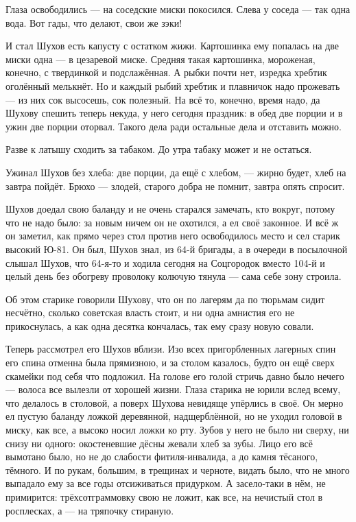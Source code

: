 Глаза освободились --- на соседские миски покосился. Слева у соседа --- так одна вода. Вот гады, что делают, свои же зэки!

И стал Шухов есть капусту с остатком жижи. Картошинка ему попалась на две миски одна --- в цезаревой миске. Средняя такая картошинка, мороженая, конечно, с твердинкой и подслажённая. А рыбки почти нет, изредка хребтик оголённый мелькнёт. Но и каждый рыбий хребтик и плавничок надо прожевать --- из них сок высосешь, сок полезный. На всё то, конечно, время надо, да Шухову спешить теперь некуда, у него сегодня праздник: в обед две порции и в ужин две порции оторвал. Такого дела ради остальные дела и отставить можно.

Разве к латышу сходить за табаком. До утра табаку может и не остаться.

Ужинал Шухов без хлеба: две порции, да ещё с хлебом, --- жирно будет, хлеб на завтра пойдёт. Брюхо --- злодей, старого добра не помнит, завтра опять спросит.

Шухов доедал свою баланду и не очень старался замечать, кто вокруг, потому что не надо было: за новым ничем он не охотился, а ел своё законное. И всё ж он заметил, как прямо через стол против него освободилось место и сел старик высокий Ю-81. Он был, Шухов знал, из 64-й бригады, а в очереди в посылочной слышал Шухов, что 64-я-то и ходила сегодня на Соцгородок вместо 104-й и целый день без обогреву проволоку колючую тянула --- сама себе зону строила.

Об этом старике говорили Шухову, что он по лагерям да по тюрьмам сидит несчётно, сколько советская власть стоит, и ни одна амнистия его не прикоснулась, а как одна десятка кончалась, так ему сразу новую совали.

Теперь рассмотрел его Шухов вблизи. Изо всех пригорбленных лагерных спин его спина отменна была прямизною, и за столом казалось, будто он ещё сверх скамейки под себя что подложил. На голове его голой стричь давно было нечего --- волоса все вылезли от хорошей жизни. Глаза старика не юрили вслед всему, что делалось в столовой, а поверх Шухова невидяще упёрлись в своё. Он мерно ел пустую баланду ложкой деревянной, надщерблённой, но не уходил головой в миску, как все, а высоко носил ложки ко рту. Зубов у него не было ни сверху, ни снизу ни одного: окостеневшие дёсны жевали хлеб за зубы. Лицо его всё вымотано было, но не до слабости фитиля-инвалида, а до камня тёсаного, тёмного. И по рукам, большим, в трещинах и черноте, видать было, что не много выпадало ему за все годы отсиживаться придурком. А засело-таки в нём, не примирится: трёхсотграммовку свою не ложит, как все, на нечистый стол в росплесках, а --- на тряпочку стираную.

